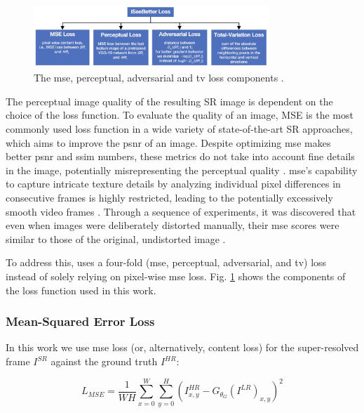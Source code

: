 \documentclass[conference]{IEEEtran}
\begin{document}
\begin{figure}[t]
	\centering
    \centerline{\includegraphics[width=8.9cm]{loss}}
	\caption{The \acrshort{mse}, perceptual, adversarial and \acrshort{tv} loss components \cite{iSeeBetter_2020}.}
	\label{fig:loss}
\end{figure}

The perceptual image quality of the resulting SR image is dependent on the choice of the loss function. To evaluate the quality of an image, MSE is the most commonly used loss function in a wide variety of state-of-the-art SR approaches, which aims to improve the \acrshort{psnr} of an image. Despite optimizing \acrshort{mse} makes better \acrshort{psnr} and \acrshort{ssim} numbers, these metrics do not take into account fine details in the image, potentially misrepresenting the perceptual quality \cite{iSeeBetter_2020}. \acrshort{mse}'s capability to capture intricate texture details by analyzing individual pixel differences in consecutive frames is highly restricted, leading to the potentially excessively smooth video frames \cite{fast_video_super_reso_ann_2012}. Through a sequence of experiments, it was discovered that even when images were deliberately distorted manually, their \acrshort{mse} scores were similar to those of the original, undistorted image \cite{universal_image_quality_index_2002}.

To address this, \cite{iSeeBetter_2020} uses a four-fold (\acrlong{mse}, perceptual, adversarial, and \acrlong{tv}) loss instead of solely relying on pixel-wise \acrshort{mse} loss. Fig. \ref{fig:loss} shows the components of the loss function used in this work.

\subsubsection{Mean-Squared Error Loss}

In this work we use \acrshort{mse} loss (or, alternatively, content loss) for the super-resolved frame $I^{SR}$ against the ground truth $I^{HR}$:

\begin{equation} \label{eq:mse_loss}
	L_{MSE} = \frac{1}{WH} \sum_{x=0}^{W} \sum_{y=0}^{H} ( I^{HR}_{x,y} - G_{\theta_G} (I^{LR})_{x,y} )^2
\end{equation}
\end{document}
